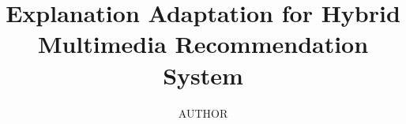 \documentclass[11pt,a4paper]{article}
\title{Explanation Adaptation for Hybrid Multimedia Recommendation System}
\author{AUTHOR}
\begin{document}
\makecover
\maketaskdescription
\makededication
\makeabstract
\maketoc
\cleardoublepage













\end{document}
